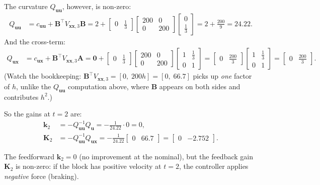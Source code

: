 \documentclass[11pt,twoside]{report}
\theoremstyle{definition}
\theoremstyle{plain}
\theoremstyle{remark}
\newcommand{\x}{\bm{x}}
\newcommand{\uu}{\bm{u}}
\newcommand{\0}{\bm{0}}
\begin{document}
\begin{stepbox}[Step-by-step: iLQR backward pass on the block ($T=3$, $h=1/3$, $w=100$)]
The curvature $Q_{\uu\uu}$, however, is non-zero:
\begin{align*}
Q_{\uu\uu}&=c_{\uu\uu}+\bm{B}^{\!\top}V_{\x\x,3}\bm{B}
=2+\begin{bmatrix}0&\tfrac13\end{bmatrix}\begin{bmatrix}200&0\\0&200\end{bmatrix}\begin{bmatrix}0\\\tfrac13\end{bmatrix}
=2+\tfrac{200}{9}=24.22.
\end{align*}
And the cross-term:
\begin{align*}
Q_{\uu\x}&=c_{\uu\x}+\bm{B}^{\!\top}V_{\x\x,3}\bm{A}
=\0+\begin{bmatrix}0&\tfrac13\end{bmatrix}\begin{bmatrix}200&0\\0&200\end{bmatrix}\begin{bmatrix}1&\tfrac13\\0&1\end{bmatrix}
=\begin{bmatrix}0&\tfrac{200}{3}\end{bmatrix}\begin{bmatrix}1&\tfrac13\\0&1\end{bmatrix}
=\begin{bmatrix}0&\tfrac{200}{3}\end{bmatrix}.
\end{align*}
(Watch the bookkeeping: $\bm{B}^{\!\top}V_{\x\x,3}=[0,\;200h]=[0,\;66.7]$
picks up \emph{one} factor of $h$, unlike the $Q_{\uu\uu}$ computation
above, where $\bm{B}$ appears on both sides and contributes $h^{2}$.)

So the gains at $t=2$ are:
\begin{align*}
\bm{k}_{2}&=-Q_{\uu\uu}^{-1}Q_{\uu}=-\frac{1}{24.22}\cdot 0=0,\\
\bm{K}_{2}&=-Q_{\uu\uu}^{-1}Q_{\uu\x}=-\frac{1}{24.22}\begin{bmatrix}0&66.7\end{bmatrix}=\begin{bmatrix}0&-2.752\end{bmatrix}.
\end{align*}

The feedforward $\bm{k}_{2}=0$ (no improvement at the nominal), but the feedback gain $\bm{K}_{2}$ is non-zero: if the block has positive velocity at $t=2$, the controller applies \emph{negative} force (braking).


\end{stepbox}
\end{document}
